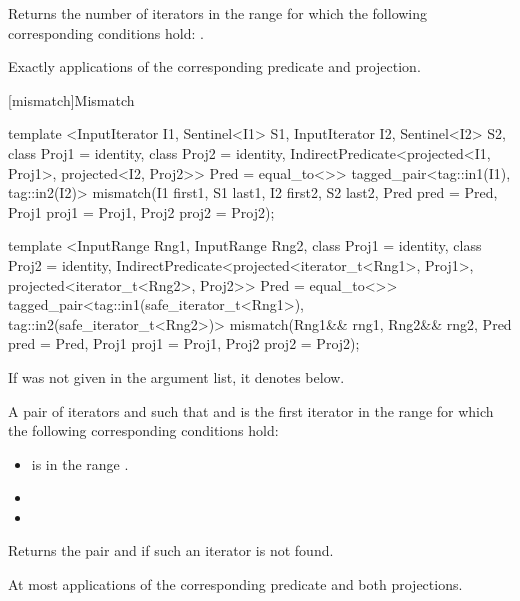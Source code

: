 \begin{itemdescr}
\pnum
\effects
Returns the number of iterators
in the range 
for which the following corresponding
conditions hold:
.

\pnum
\complexity
Exactly
applications of the corresponding predicate and projection.
\end{itemdescr}

[mismatch]{Mismatch}

%
\begin{itemdecl}
template <InputIterator I1, Sentinel<I1> S1, InputIterator I2, Sentinel<I2> S2,
    class Proj1 = identity, class Proj2 = identity,
    IndirectPredicate<projected<I1, Proj1>, projected<I2, Proj2>> Pred = equal_to<>>
  tagged_pair<tag::in1(I1), tag::in2(I2)>
    mismatch(I1 first1, S1 last1, I2 first2, S2 last2, Pred pred = Pred{},
             Proj1 proj1 = Proj1{}, Proj2 proj2 = Proj2{});

template <InputRange Rng1, InputRange Rng2,
    class Proj1 = identity, class Proj2 = identity,
    IndirectPredicate<projected<iterator_t<Rng1>, Proj1>,
      projected<iterator_t<Rng2>, Proj2>> Pred = equal_to<>>
  tagged_pair<tag::in1(safe_iterator_t<Rng1>), tag::in2(safe_iterator_t<Rng2>)>
    mismatch(Rng1&& rng1, Rng2&& rng2, Pred pred = Pred{},
             Proj1 proj1 = Proj1{}, Proj2 proj2 = Proj2{});
\end{itemdecl}

\begin{itemdescr}
\pnum
\remarks If  was not given in the argument list, it denotes
 below.

\pnum
\returns
A pair of iterators
and
such that
and
is the first iterator
in the range 
for which the following corresponding conditions hold:

\begin{itemize}
\item {} is in the range \tcode{[first2, last2)}.
\item {}
\item {}
\end{itemize}

Returns the pair
and
if such an iterator
is not found.

\pnum
\complexity
At most
applications of the corresponding predicate and both projections.
\end{itemdescr}

